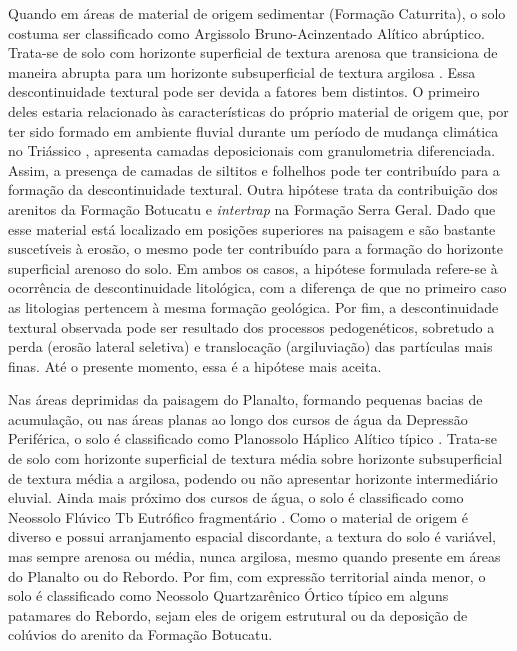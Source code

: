 Quando em áreas de material de origem sedimentar (Formação Caturrita), o solo costuma ser classificado como 
Argissolo Bruno-Acinzentado Alítico abrúptico. Trata-se de solo com horizonte superficial de textura arenosa 
que transiciona de maneira abrupta para um horizonte subsuperficial de textura argilosa \cite{Miguel2010}. 
Essa descontinuidade textural pode ser devida a fatores bem distintos. O primeiro deles estaria relacionado às 
características do próprio material de origem que, por ter sido formado em ambiente fluvial durante um período 
de mudança climática no Triássico \cite{PieriniEtAl2002}, apresenta camadas deposicionais com granulometria 
diferenciada. Assim, a presença de camadas de siltitos e folhelhos pode ter contribuído para a formação da 
descontinuidade textural. Outra hipótese trata da contribuição dos arenitos da Formação Botucatu e 
\emph{intertrap} na Formação Serra Geral. Dado que esse material está localizado em posições superiores na 
paisagem e são bastante suscetíveis à erosão, o mesmo pode ter contribuído para a formação do horizonte 
superficial arenoso do solo. Em ambos os casos, a hipótese formulada refere-se à ocorrência de descontinuidade 
litológica, com a diferença de que no primeiro caso as litologias pertencem à mesma formação geológica. Por 
fim, a descontinuidade textural observada pode ser resultado dos processos pedogenéticos, sobretudo a perda 
(erosão lateral seletiva) e translocação (argiluviação) das partículas mais finas. Até o presente momento, 
essa é a hipótese mais aceita.

Nas áreas deprimidas da paisagem do Planalto, formando pequenas bacias de acumulação, ou nas áreas planas ao 
longo dos cursos de água da Depressão Periférica, o solo é classificado como Planossolo Háplico Alítico típico 
\cite{Miguel2010}. Trata-se de solo com horizonte superficial de textura média sobre horizonte subsuperficial 
de textura média a argilosa, podendo ou não apresentar horizonte intermediário eluvial. Ainda mais próximo dos 
cursos de água, o solo é classificado como Neossolo Flúvico Tb Eutrófico fragmentário \cite{Miguel2010}. Como 
o material de origem é diverso e possui arranjamento espacial discordante, a textura do solo é variável, mas 
sempre arenosa ou média, nunca argilosa, mesmo quando presente em áreas do Planalto ou do Rebordo. Por fim, 
com expressão territorial ainda menor, o solo é classificado como Neossolo Quartzarênico Órtico típico em 
alguns patamares do Rebordo, sejam eles de origem estrutural ou da deposição de colúvios do arenito da Formação 
Botucatu.


